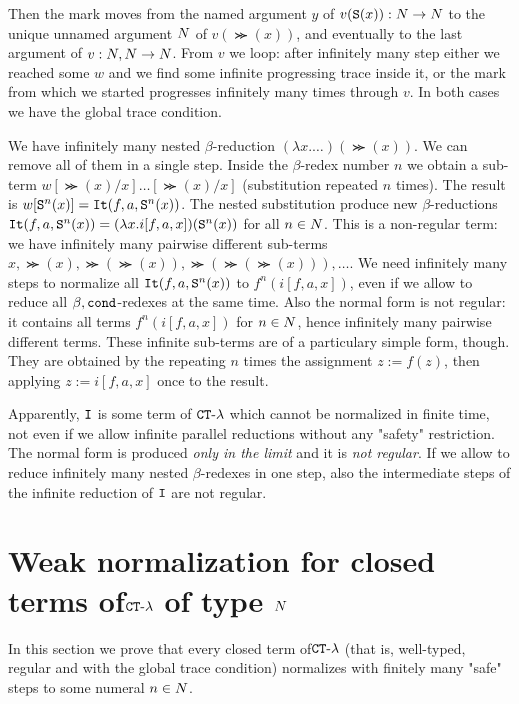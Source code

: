 \documentclass{article}
\begin{document}
Then the mark moves from the named argument $y$ of $v({\tt S} (x)):{N} \rightarrow {N}$ to the unique 
unnamed argument ${N}$ of $v(\Succ (x))$, and eventually to the last argument of $v:{N},{N}\rightarrow {N}$. 
From $v$ we loop: after infinitely many step either we reached some $w$ and we find 
some infinite progressing trace inside it, or the
mark from which we started progresses infinitely many times through $v$. In both cases we have the
global trace condition.

We have infinitely many nested $\beta$-reduction $(\lambda x. \ldots)(\Succ (x))$.
We can remove all of them in a single step. Inside the $\beta$-redex number $n$ we obtain a sub-term
$w[\Succ (x)/x]\ldots[\Succ (x)/x]$ (substitution repeated $n$ times).
The result is $w[{\tt S} ^n(x)] = {\tt It}(f,a,{\tt S} ^n(x))$.
The nested substitution produce new $\beta$-reductions 
${\tt It}(f,a,{\tt S} ^n(x)) = (\lambda x.i[f,a,x])({\tt S} ^n(x))$ for all $n \in {N}$.
This is a non-regular term: we have infinitely many pairwise different 
sub-terms $x,\Succ (x),\Succ (\Succ (x)), \Succ (\Succ (\Succ (x))), \ldots$.
We need infinitely many steps to normalize all ${\tt It}(f,a,{\tt S} ^n(x))$ to $f^n(i[f,a,x])$, 
even if we allow to reduce all $\beta,{\tt cond}$-redexes at the same time.
Also the normal form is not regular: it contains all terms $f^n(i[f,a,x])$ for $n \in {N}$, hence
infinitely many pairwise different terms. These infinite sub-terms are of a particulary simple form, though. 
They are obtained by the repeating $n$ times the assignment $z:=f(z)$, then applying $z:=i[f,a,x]$ once
to the result.

Apparently, ${\tt I}$ 
is some term of ${ {\tt CT} \mbox{-} \lambda}$ which cannot be normalized in finite time, not even if we allow
infinite parallel reductions without any "safety" restriction. The normal form is produced \emph{only in the limit}
and it is \emph{not regular}. If we allow to reduce infinitely many nested $\beta$-redexes in one step, also
the intermediate steps of the infinite reduction of ${\tt I}$ are not regular.


\section{Weak normalization for closed terms of${ {\tt CT} \mbox{-} \lambda}$ of type ${N}$}
\label{section-weak-normalization}
In this section we prove that every closed term of${ {\tt CT} \mbox{-} \lambda}$
 (that is, well-typed, regular and with the global trace condition) normalizes with finitely many "safe" steps
to some numeral $n \in {N}$.
\end{document}
